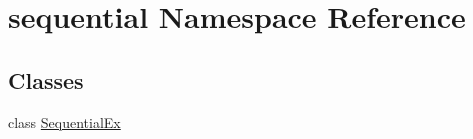 \hypertarget{namespacesequential}{\section{sequential Namespace Reference}
\label{namespacesequential}
}
\subsection*{Classes}
\begin{DoxyCompactItemize}
\item 
class \hyperlink{classsequential_1_1SequentialEx}{Sequential\-Ex}
\end{DoxyCompactItemize}
